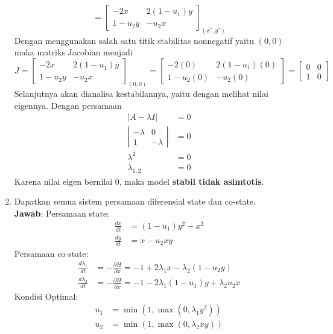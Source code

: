 \documentclass{article}
\begin{document}
\begin{enumerate}[label=\alph*.]
\[    = 
    \begin{bmatrix}
    -2x & 2(1-u_1)y \\
    1-u_2y & -u_2x
    \end{bmatrix}_{(x^*,y^*)}
    \]
    Dengan menggunakan salah satu titik stabilitas nonnegatif yaitu $(0,0)$ maka matriks Jacobian menjadi
    \[
    J = 
    \begin{bmatrix}
    -2x & 2(1-u_1)y \\
    1-u_2y & -u_2x
    \end{bmatrix}_{(0,0)}
    =
        \begin{bmatrix}
            -2(0) & 2(1-u_1)(0) \\
            1-u_2(0) & -u_2(0)
        \end{bmatrix} 
        =
        \begin{bmatrix}
            0 & 0 \\
            1 & 0
        \end{bmatrix}
    \]
    Selanjutnya akan dianalisa kestabilannya, yaitu dengan melihat nilai eigennya. Dengan persamaan
    \begin{align*}
    |A- \lambda I| &= 0 \\
        \left| \begin{array}{cc}
    -\lambda & 0 \\
     1& -\lambda
    \end{array} \right| &= 0 \\
    \lambda^2 &=0 \\
    \lambda_{1,2} &= 0
    \end{align*}
    Karena nilai eigen bernilai $0$, maka model \textbf{stabil tidak asimtotis}.
    
    \item Dapatkan semua sistem persamaan diferensial state dan co-state.\\
    \textbf{Jawab}: Persamaan state:
    \begin{align*}
        \frac{dx}{dt} &= (1-u_1)y^2 - x^2 \\
        \frac{dy}{dt} &= x - u_2xy
    \end{align*}
    Persamaan co-state:
    \begin{align*}
        \frac{d\lambda_1}{dt} &= -\frac{\partial H}{\partial x} = -1 + 2\lambda_1x - \lambda_2(1-u_2y) \\
        \frac{d\lambda_2}{dt} &= -\frac{\partial H}{\partial x} = -1 - 2\lambda_1(1-u_1)y + \lambda_2u_2x
    \end{align*}
    Kondisi Optimal:
    \begin{align*}
        u_1 &= \min(1, \max(0, \lambda_1y^2)) \\
        u_2 &= \min(1, \max(0, \lambda_2xy))
    \end{align*}
    

\end{enumerate}
\end{document}
